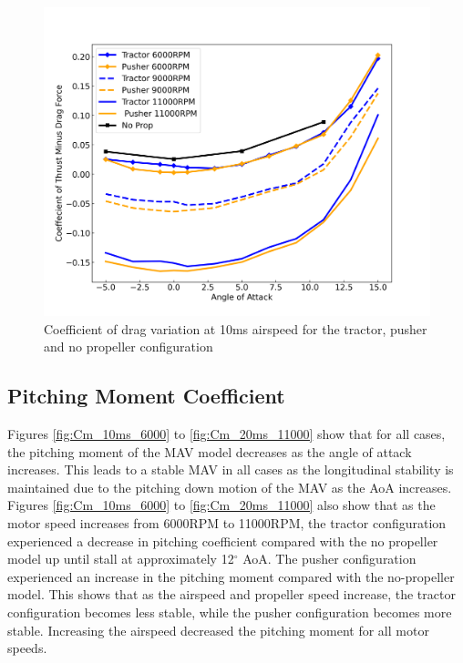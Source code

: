 \begin{figure}[H]
    \centering
    \includegraphics[scale = 0.45]{05_Results/Figs/Cd/10ms_Cd.png}
    \caption{Coefficient of drag variation at 10ms airspeed for the tractor, pusher and no propeller configuration}
    \label{fig:tesing2}
\end{figure}



\subsection{Pitching Moment Coefficient}

Figures \ref{fig:Cm_10ms_6000} to \ref{fig:Cm_20ms_11000} show that for all cases, the pitching moment of the \acrshort{MAV} model decreases as the angle of attack increases. This leads to a stable \acrshort{MAV} in all cases as the longitudinal stability is maintained due to the pitching down motion of the \acrshort{MAV} as the \acrshort{AoA} increases. Figures \ref{fig:Cm_10ms_6000} to \ref{fig:Cm_20ms_11000} also show that as the motor speed increases from 6000RPM to 11000RPM, the tractor configuration experienced a decrease in pitching coefficient compared with the no propeller model up until stall at approximately 12$^\circ$ \acrshort{AoA}. The pusher configuration experienced an increase in the pitching moment compared with the no-propeller model. This shows that as the airspeed and propeller speed increase, the tractor configuration becomes less stable, while the pusher configuration becomes more stable. Increasing the airspeed decreased the pitching moment for all motor speeds.

